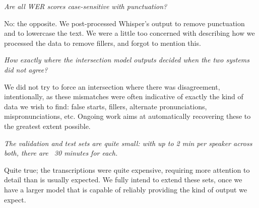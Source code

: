 \documentclass[11pt]{journalrebuttal}
\begin{document}
\textit{Are all WER scores case-sensitive with punctuation?}

No: the opposite. We post-processed Whisper's output to remove punctuation and to lowercase the text. We were a little too concerned with describing how we processed the data to remove fillers, and forgot to mention this.



\textit{How exactly where the intersection model outputs decided when the two systems did not agree?}

We did not try to force an intersection where there was disagreement, intentionally, as these mismatches were often indicative of exactly the kind of data we wish to find: false starts, fillers, alternate pronunciations, mispronunciations, etc. Ongoing work aims at automatically recovering these to the greatest extent possible.

\textit{The validation and test sets are quite small: with up to 2 min per speaker across both, there are ~30 minutes for each.}

Quite true; the transcriptions were quite expensive, requiring more attention to detail than is usually expected. We fully intend to extend these sets, once we have a larger model that is capable of reliably providing the kind of output we expect.

\end{document}
